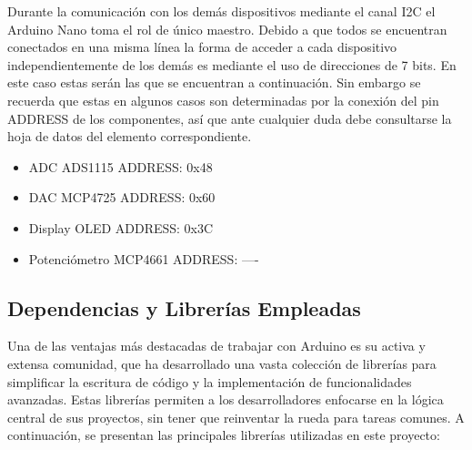 Durante la comunicación con los demás dispositivos mediante el canal I2C el Arduino Nano toma el rol de único maestro. Debido a que todos se encuentran conectados en una misma línea la forma de acceder a cada dispositivo independientemente de los demás es mediante el uso de direcciones de 7 bits. En este caso estas serán las que se encuentran a continuación. Sin embargo se recuerda que estas en algunos casos son determinadas por la conexión del pin ADDRESS de los componentes, así que ante cualquier duda debe consultarse la hoja de datos del elemento correspondiente.
\begin{itemize}
    \item ADC ADS1115 ADDRESS: 0x48
    \item DAC MCP4725 ADDRESS: 0x60
    \item Display OLED ADDRESS: 0x3C
    \item Potenciómetro MCP4661 ADDRESS: ----
\end{itemize}

\subsection{Dependencias y Librerías Empleadas}

Una de las ventajas más destacadas de trabajar con Arduino es su activa y extensa comunidad, que ha desarrollado una vasta colección de librerías para simplificar la escritura de código y la implementación de funcionalidades avanzadas. Estas librerías permiten a los desarrolladores enfocarse en la lógica central de sus proyectos, sin tener que reinventar la rueda para tareas comunes. A continuación, se presentan las principales librerías utilizadas en este proyecto:

